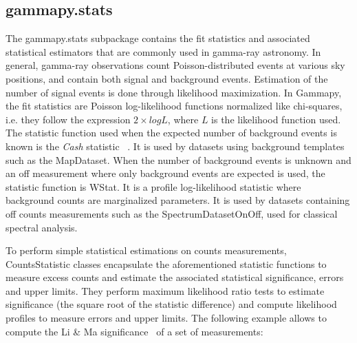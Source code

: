 \subsection{gammapy.stats}
\label{ssec:gammapy-stats}


The gammapy.stats subpackage contains the fit statistics and associated statistical estimators
that are commonly used in gamma-ray astronomy.
In general, gamma-ray observations count Poisson-distributed events at various sky positions,
and contain both signal and background events. Estimation of the number of signal events is done
through likelihood maximization. In Gammapy, the fit statistics are Poisson log-likelihood functions
normalized like chi-squares, i.e. they follow the expression $2 \times log L$, where $L$ is the
likelihood function used.
The statistic function used when the expected number of background events is known
is the \emph{Cash} statistic ~\citep{Cash}. It is used by datasets using background
templates such as the MapDataset. When the number of background events is unknown and
an off measurement where only background events are expected is used, the statistic function
is WStat. It is a profile log-likelihood statistic where background counts are
marginalized parameters. It is used by datasets containing off counts measurements
such as the SpectrumDatasetOnOff, used for classical spectral analysis.

To perform simple statistical estimations on counts measurements, CountsStatistic classes
encapsulate the aforementioned statistic functions to measure excess counts and estimate the
associated statistical significance, errors and upper limits. They perform maximum likelihood
ratio tests to estimate significance (the square root of the statistic difference) and compute
likelihood profiles to measure errors and upper limits. The following example allows to compute
the Li \& Ma significance~\citep{LiMa} of a set of measurements:
